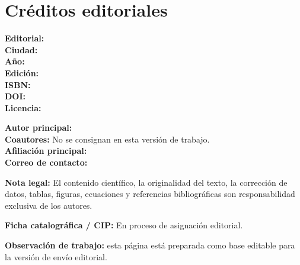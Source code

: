 \thispagestyle{empty}

\chapter*{Créditos editoriales}

\noindent\textbf{Editorial:} \EditorialLibro\\
\textbf{Ciudad:} \CiudadEditorial\\
\textbf{Año:} \AnioEdicion\\
\textbf{Edición:} \EdicionLibro\\
\textbf{ISBN:} \ISBNLibro\\
\textbf{DOI:} \DOILibro\\
\textbf{Licencia:} \LicenciaLibro

\vspace{1em}

\noindent\textbf{Autor principal:} \AutorPrincipal\\
\textbf{Coautores:} No se consignan en esta versión de trabajo.\\
\textbf{Afiliación principal:} \AfiliacionPrincipal\\
\textbf{Correo de contacto:} \CorreoContacto

\vspace{1.5em}

\noindent\textbf{Nota legal:} El contenido científico, la originalidad del texto, la corrección
de datos, tablas, figuras, ecuaciones y referencias bibliográficas son responsabilidad exclusiva
de los autores.

\vspace{1.5em}

\noindent\textbf{Ficha catalográfica / CIP:} En proceso de asignación editorial.

\vspace{1.5em}

\noindent\textbf{Observación de trabajo:} esta página está preparada como base editable para la
versión de envío editorial.
